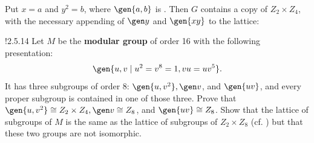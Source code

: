 \begin{sol}
    Put $x = a$ and $y^2 = b$, where $\gen{a, b}$ is .
	Then $G$ contains a copy of $Z_2 \times Z_4$, with the necessary appending of $\gen y$ and $\gen{xy}$ to the lattice:
    \begin{center}
    \end{center}\vspace{-3ex}
\end{sol}

\begin{exercise}!{2.5.14} 
    Let $M$ be the \textbf{modular group} of order 16 with the following presentation:
    \[
    	\gen{u, v \mid u^2 = v^8 = 1, vu = uv^5}.
    \]
    It has three subgroups of order 8: $\gen{u, v^2}, \gen v$, and $\gen{uv}$, and every proper subgroup is contained in one of those three.
	Prove that $\gen{u, v^2} \cong Z_2 \times Z_4, \gen v \cong Z_8$, and $\gen{uv} \cong Z_8$.
	Show that the lattice of subgroups of $M$ is the same as the lattice of subgroups of $Z_2 \times Z_8$ (cf. ) but that these two groups are not isomorphic.
\end{exercise}

